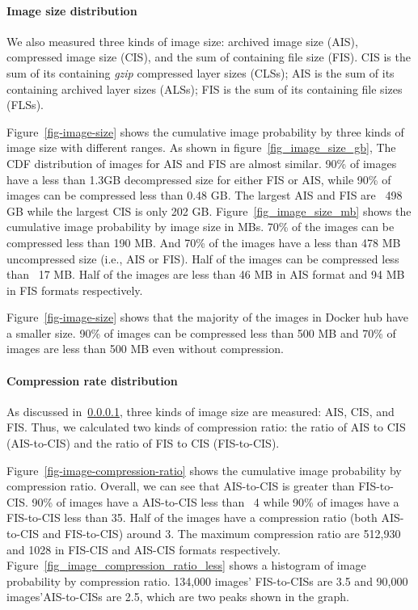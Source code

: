 \paragraph{Image size distribution}
\label{sec:image-size}
We also measured three kinds of image size: archived image size (AIS), compressed image size (CIS), and the sum of containing file size (FIS). CIS is the sum of its containing \textit{gzip} compressed layer sizes (CLSs); AIS is the sum of its containing archived layer sizes (ALSs); FIS is the sum of its containing file sizes (FLSs).

Figure~\ref{fig-image-size} shows the cumulative image probability by three kinds of image size with different ranges.
As shown in figure~\ref{fig_image_size_gb}, The CDF distribution of images for AIS and FIS are almost similar. 90\% of images have a less than 1.3GB decompressed size for either FIS or AIS, while 90\% of images can be compressed less than 0.48 GB. The largest AIS and FIS are ~498 GB while the largest CIS is only 202 GB.
Figure~\ref{fig_image_size_mb} shows the cumulative image probability by image size in MBs. 70\% of the images can be compressed less than 190 MB. And 70\% of the images have a less than 478 MB uncompressed size (i.e., AIS or FIS). Half of the images can be compressed less than ~17 MB. Half of the images are less than 46 MB in AIS format and 94 MB in FIS formats respectively.

Figure~\ref{fig-image-size} shows that the majority of the images in Docker hub have a smaller size. 90\% of images can be compressed less than 500 MB and 70\% of images are less than 500 MB even without compression. 



\paragraph{Compression rate distribution}



As discussed in~\ref{sec:image-size}, three kinds of image size are measured: AIS, CIS, and FIS. Thus, we calculated two kinds of compression ratio: the ratio of AIS to CIS (AIS-to-CIS) and the ratio of FIS to CIS (FIS-to-CIS). 

Figure~\ref{fig-image-compression-ratio} shows the cumulative image probability by compression ratio. Overall, we can see that AIS-to-CIS is greater than FIS-to-CIS. 90\% of images have a AIS-to-CIS less than ~4 while 90\% of images have a FIS-to-CIS less than 35. Half of the images have a compression ratio (both AIS-to-CIS and FIS-to-CIS) around 3. The maximum compression ratio are 512,930 and 1028 in FIS-CIS and AIS-CIS formats respectively.
Figure~\ref{fig_image_compression_ratio_less} shows a histogram of image probability by compression ratio. 134,000 images' FIS-to-CISs are 3.5 and 90,000 images'AIS-to-CISs are 2.5, which are two peaks shown in the graph.

